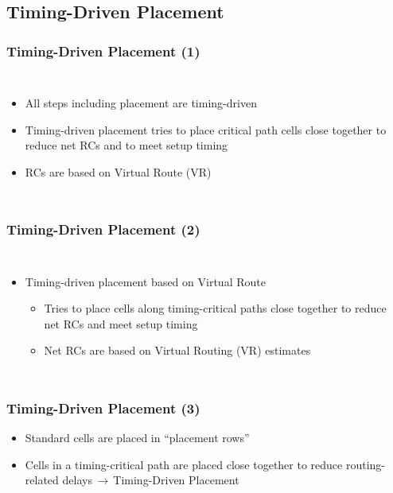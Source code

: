 \documentclass[compress]{beamer}
\begin{document}
	\subsection[Timing]{Timing-Driven Placement}
	\begin{frame}
		\frametitle{Timing-Driven Placement (1)}
		\begin{columns}	
		\begin{itemize}
			\item All steps including placement are timing-driven
			
			\item Timing-driven placement tries to place critical path cells close together to reduce net  RCs and to meet setup timing
			\item RCs are based on Virtual Route (VR)
			
		\end{itemize}
	\begin{center}
	\end{center}
\end{columns}
	\end{frame}
\begin{frame}
	\frametitle{Timing-Driven Placement (2)}
	\begin{columns}	
		\column{0.5\textwidth}
		\begin{itemize}
			\item Timing-driven placement based on Virtual Route
			
			\begin{itemize}
			\item Tries to place cells along timing-critical paths close together to reduce net RCs and meet setup timing
			
			\item Net RCs are based on Virtual Routing (VR) estimates
			
			\end{itemize}
			
		\end{itemize}
		\column{0.5\textwidth}
		\begin{center}
		\end{center}
	\end{columns}
\end{frame}

\begin{frame}
	\frametitle{Timing-Driven Placement (3)}
	\begin{itemize}
		\item Standard cells are placed in “placement rows”
		\item Cells in a timing-critical path are placed close together to reduce routing-related delays$\,\to\,$Timing-Driven Placement
		
	\end{itemize}
	\begin{center}
	\end{center}
\end{frame}
\end{document}
